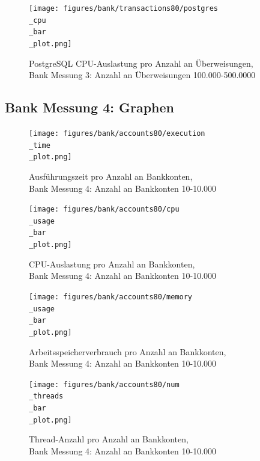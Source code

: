 \documentclass[fontsize=12pt,paper=a4,twoside=semi,parskip=half-,headsepline,headinclude]{scrreprt}
\begin{document}
\begin{figure}[H]
	\centering
	\texttt{[image: figures/bank/transactions80/postgres\\\_cpu\\\_bar\\\_plot.png]}
	\caption{PostgreSQL CPU-Auslastung pro Anzahl an Überweisungen,\\ Bank Messung 3: Anzahl an Überweisungen 100.000-500.0000}
	\label{fig:bankTransactions80PostgCPU}
\end{figure}

\subsection{Bank Messung 4: Graphen}
\label{subsec:bank4graph}

\begin{figure}[H]
	\centering
	\texttt{[image: figures/bank/accounts80/execution\\\_time\\\_plot.png]}
	\caption{Ausführungszeit pro Anzahl an Bankkonten,\\ Bank Messung 4: Anzahl an Bankkonten 10-10.000}
	\label{fig:bankAccounts80Zeit}
\end{figure}

\begin{figure}[H]
	\centering
	\texttt{[image: figures/bank/accounts80/cpu\\\_usage\\\_bar\\\_plot.png]}
	\caption{CPU-Auslastung pro Anzahl an Bankkonten,\\ Bank Messung 4: Anzahl an Bankkonten 10-10.000}
	\label{fig:bankAccounts80CPU}
\end{figure}

\begin{figure}[H]
	\centering
	\texttt{[image: figures/bank/accounts80/memory\\\_usage\\\_bar\\\_plot.png]}
	\caption{Arbeitsspeicherverbrauch pro Anzahl an Bankkonten,\\ Bank Messung 4: Anzahl an Bankkonten 10-10.000}
	\label{fig:bankAccounts80RAM}
\end{figure}

\begin{figure}[H]
	\centering
	\texttt{[image: figures/bank/accounts80/num\\\_threads\\\_bar\\\_plot.png]}
	\caption{Thread-Anzahl pro Anzahl an Bankkonten,\\ Bank Messung 4: Anzahl an Bankkonten 10-10.000}
	\label{fig:bankAccounts80Threads}
\end{figure}
\end{document}
